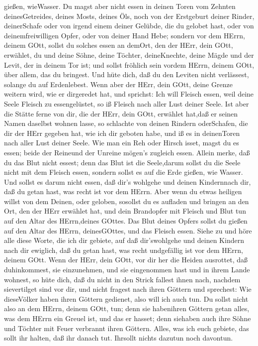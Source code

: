 gießen, wieWasser.  Du magst aber nicht essen in deinen
Toren vom Zehnten deinesGetreides, deines Mosts, deines Öls, noch von
der Erstgeburt deiner Rinder, deinerSchafe oder von irgend einem deiner
Gelübde, die du gelobet hast, oder von deinemfreiwilligen Opfer, oder
von deiner Hand Hebe;  sondern vor dem HErrn, deinem GOtt,
sollst du solches essen an demOrt, den der HErr, dein GOtt, erwählet, du
und deine Söhne, deine Töchter, deineKnechte, deine Mägde und der Levit,
der in deinem Tor ist; und sollst fröhlich sein vordem HErrn, deinem
GOtt, über allem, das du bringest.  Und hüte dich, daß du
den Leviten nicht verlässest, solange du auf Erdenlebest. 
Wenn aber der HErr, dein GOtt, deine Grenze weitern wird, wie er
dirgeredet hat, und sprichst: Ich will Fleisch essen, weil deine Seele
Fleisch zu essengelüstet, so iß Fleisch nach aller Lust deiner Seele.
 Ist aber die Stätte ferne von dir, die der HErr, dein
GOtt, erwählet hat,daß er seinen Namen daselbst wohnen lasse, so
schlachte von deinen Rindern oderSchafen, die dir der HErr gegeben hat,
wie ich dir geboten habe, und iß es in deinenToren nach aller Lust
deiner Seele.  Wie man ein Reh oder Hirsch isset, magst du
es essen; beide der Reineund der Unreine mögen's zugleich essen.
 Allein merke, daß du das Blut nicht essest; denn das Blut
ist die Seele,darum sollst du die Seele nicht mit dem Fleisch essen,
 sondern sollst es auf die Erde gießen, wie Wasser.
 Und sollst es darum nicht essen, daß dir's wohlgehe und
deinen Kindernnach dir, daß du getan hast, was recht ist vor dem HErrn.
 Aber wenn du etwas heiligen willst von dem Deinen, oder
geloben, sosollst du es aufladen und bringen an den Ort, den der HErr
erwählet hat,  und dein Brandopfer mit Fleisch und Blut tun
auf den Altar des HErrn,deines GOttes. Das Blut deines Opfers sollst du
gießen auf den Altar des HErrn, deinesGOttes, und das Fleisch essen.
 Siehe zu und höre alle diese Worte, die ich dir gebiete,
auf daß dir'swohlgehe und deinen Kindern nach dir ewiglich, daß du getan
hast, was recht undgefällig ist vor dem HErrn, deinem GOtt.
 Wenn der HErr, dein GOtt, vor dir her die Heiden
ausrottet, daß duhinkommest, sie einzunehmen, und sie eingenommen hast
und in ihrem Lande wohnest,  so hüte dich, daß du nicht in
den Strick fallest ihnen nach, nachdem sievertilget sind vor dir, und
nicht fragest nach ihren Göttern und sprechest: Wie dieseVölker haben
ihren Göttern gedienet, also will ich auch tun.  Du sollst
nicht also an dem HErrn, deinem GOtt, tun; denn sie habenihren Göttern
getan alles, was dem HErrn ein Greuel ist, und das er hasset; denn
siehaben auch ihre Söhne und Töchter mit Feuer verbrannt ihren Göttern.
 Alles, was ich euch gebiete, das sollt ihr halten, daß ihr
danach tut. Ihrsollt nichts dazutun noch davontun.

